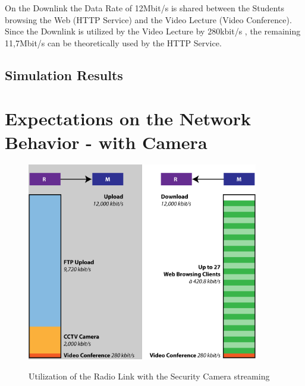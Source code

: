 \documentclass[a4paper,10pt]{book}\usepackage{graphicx}
\begin{document}
On the Downlink the Data Rate of 12Mbit/s is shared between the Students browsing the Web (HTTP Service) and the Video Lecture (Video Conference).
Since the Downlink is utilized by the Video Lecture by 280kbit/s , the remaining 11,7Mbit/s 
can be theoretically used by the HTTP Service.




\subsection{Simulation Results}






\section{Expectations on the Network Behavior - with Camera}


\begin{figure}[!ht]
  \centering
    \includegraphics[width=0.9\textwidth]{graphics-01.png}
    \label{fig:g1}
    \caption{Utilization of the Radio Link with the Security Camera streaming}
\end{figure}
\end{document}
